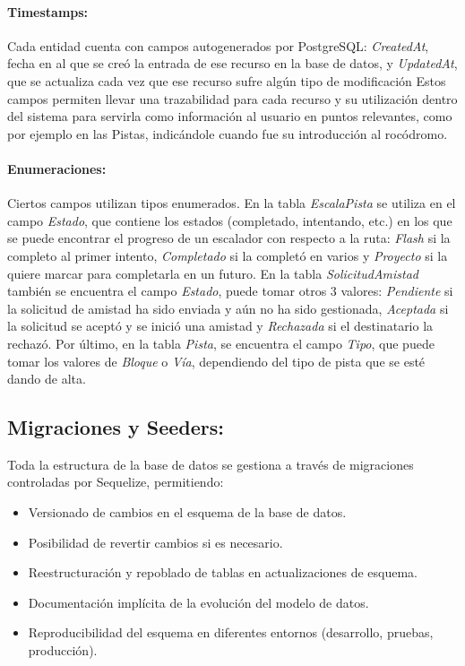 \paragraph{Timestamps:} Cada entidad cuenta con campos autogenerados por PostgreSQL: \textit{CreatedAt}, fecha en al que se creó la entrada de ese
recurso en la base de datos, y  \textit{UpdatedAt}, que se actualiza cada vez que ese recurso sufre algún tipo de modificación Estos campos permiten llevar una 
trazabilidad para cada recurso y su utilización dentro del sistema para servirla como información al usuario en puntos relevantes, como por ejemplo en las Pistas, 
indicándole cuando fue su introducción al rocódromo.

\paragraph{Enumeraciones:} Ciertos campos utilizan tipos enumerados. En la tabla \textit{EscalaPista} se utiliza en el campo \textit{Estado}, que contiene los estados  (completado, intentando, etc.) 
en los que se puede encontrar el progreso de un escalador con respecto a la ruta: \textit{Flash} si la completo al primer intento, \textit{Completado} si la completó en varios
y \textit{Proyecto} si la quiere marcar para completarla en un futuro. En la tabla \textit{SolicitudAmistad} también se encuentra el campo \textit{Estado}, puede tomar otros 3 
valores: \textit{Pendiente} si la solicitud de amistad ha sido enviada y aún no ha sido gestionada, \textit{Aceptada} si la solicitud se aceptó y se inició una amistad 
y \textit{Rechazada} si el destinatario la rechazó. Por último, en la tabla \textit{Pista}, se encuentra el campo \textit{Tipo}, que puede tomar los valores de 
\textit{Bloque} o \textit{Vía}, dependiendo del tipo de pista que se esté dando de alta.

\subsection{Migraciones y Seeders:}

Toda la estructura de la base de datos se gestiona a través de migraciones controladas por Sequelize, permitiendo:

\begin{itemize}
    \item Versionado de cambios en el esquema de la base de datos.
    \item Posibilidad de revertir cambios si es necesario.
    \item Reestructuración y repoblado de tablas en actualizaciones de esquema.
    \item Documentación implícita de la evolución del modelo de datos.
    \item Reproducibilidad del esquema en diferentes entornos (desarrollo, pruebas, producción).
\end{itemize}

